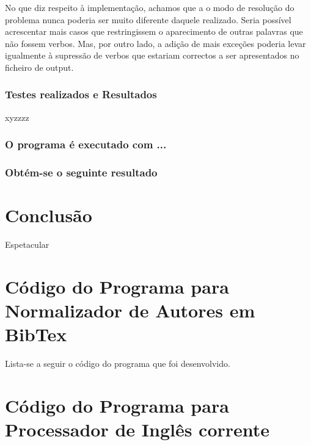 \documentclass{report}
\begin{document}
No que diz respeito à implementação, achamos que a o modo de 
resolução do problema nunca poderia ser muito diferente daquele realizado. 
Seria possível acrescentar mais casos que restringissem o aparecimento de 
outras palavras que não fossem verbos. Mas, por outro lado, a adição de mais 
exceções poderia levar igualmente à supressão de verbos 
que estariam correctos a ser apresentados no ficheiro de output.

\subsection{Testes realizados e Resultados}
xyzzzz

\subsection{O programa é executado com ...}


\subsection{Obtém-se o seguinte resultado}

\chapter{Conclusão} \label{concl}
Espetacular


\appendix
\chapter{Código do Programa para Normalizador de Autores em BibTex}

Lista-se a seguir o código  do programa  que foi desenvolvido.




\chapter{Código do Programa para Processador de Inglês corrente}





\end{document}
